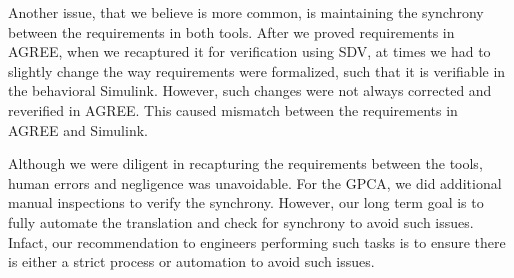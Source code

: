 Another issue, that we believe is more common, is maintaining the synchrony between the requirements in both tools. After we proved requirements in AGREE, when we recaptured it for verification using SDV, at times we had to slightly change the way requirements were formalized, such that it is verifiable in the behavioral Simulink. However, such changes were not always corrected and reverified in AGREE. This caused mismatch between the requirements in AGREE and Simulink.

Although we were diligent in recapturing the requirements between the tools, human errors and negligence was unavoidable. For the GPCA, we did additional manual inspections to verify the synchrony. However, our long term goal is to fully automate the translation and check for synchrony to avoid such issues. Infact, our recommendation to engineers performing such tasks is to ensure there is either a strict process or automation to avoid such issues.

